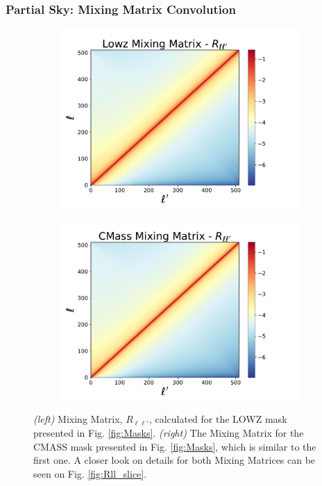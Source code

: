\subsubsection{Partial Sky: Mixing Matrix Convolution}\label{Sec:MixingMat}
\begin{figure}
\begin{subfigure}{.5\textwidth}
  \centering
  \includegraphics[width=1.2\linewidth]{BOSS-FIGS/MixMat_LOWZ}\label{fig:LOWZ_Rll}
\end{subfigure}%
\begin{subfigure}{.5\textwidth}
  \centering
  \includegraphics[width=1.2\linewidth]{BOSS-FIGS/MixMat_CMASS}\label{fig:CMASS_Rll}
\end{subfigure}
\caption[Mixing Matrix for CMASS and LOWZ.]{\textit{(left)} Mixing Matrix, $R_{\ell \ell'}$, calculated for the LOWZ mask presented in Fig. \ref{fig:Masks}. \textit{(right)} The Mixing Matrix for the CMASS mask presented in Fig. \ref{fig:Masks}, which is similar to the first one. A closer look on details for both Mixing Matrices can be seen on Fig. \ref{fig:Rll_slice}.}
\label{fig:MixMats}
\end{figure}

